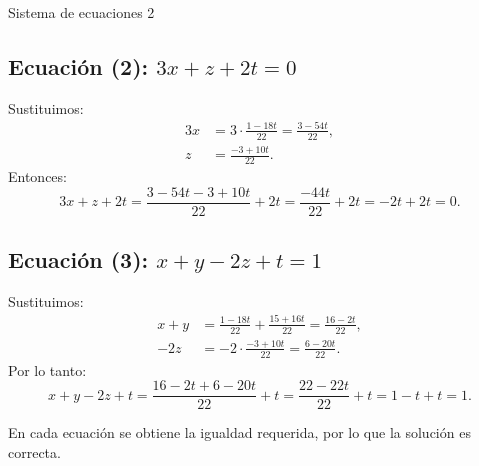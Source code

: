 \documentclass[11pt,letterpaper]{article}
\begin{document}
\begin{inciso}{Sistema de ecuaciones 2}
\subsection*{Ecuación (2): \(3x + z + 2t = 0\)}

Sustituimos:
\[
\begin{aligned}
3x &= 3\cdot\frac{1 - 18t}{22} = \frac{3 - 54t}{22},\\[1mm]
z &= \frac{-3 + 10t}{22}.
\end{aligned}
\]
Entonces:
\[
3x + z + 2t = \frac{3 - 54t - 3 + 10t}{22} + 2t = \frac{-44t}{22} + 2t = -2t + 2t = 0.
\]

\subsection*{Ecuación (3): \(x + y - 2z + t = 1\)}

Sustituimos:
\[
\begin{aligned}
x + y &= \frac{1 - 18t}{22} + \frac{15 + 16t}{22} = \frac{16 - 2t}{22},\\[1mm]
-2z &= -2\cdot\frac{-3 + 10t}{22} = \frac{6 - 20t}{22}.
\end{aligned}
\]
Por lo tanto:
\[
x + y - 2z + t = \frac{16 - 2t + 6 - 20t}{22} + t = \frac{22 - 22t}{22} + t = 1 - t + t = 1.
\]

En cada ecuación se obtiene la igualdad requerida, por lo que la solución es correcta.

\end{inciso}
\end{document}
